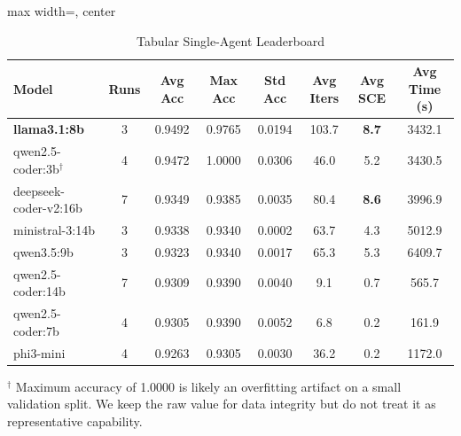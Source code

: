 \documentclass[11pt,a4paper]{article}
\begin{document}
\begin{table}[ht]
\centering
\footnotesize
\setlength{\tabcolsep}{3pt}
\caption{Tabular Single-Agent Leaderboard}
\label{tab:tabular_single}
\begin{adjustbox}{max width=\textwidth, center}
\begin{tabular}{>{\raggedright\arraybackslash}p{4.2cm}ccccccc}
\toprule
\textbf{Model} & \textbf{Runs} & \textbf{Avg Acc} & \textbf{Max Acc} & \textbf{Std Acc} & \textbf{Avg Iters} & \textbf{Avg SCE} & \textbf{Avg Time (s)} \\
\midrule
\textbf{llama3.1:8b} & 3 & 0.9492 & 0.9765 & 0.0194 & 103.7 & \textbf{8.7} & 3432.1 \\
qwen2.5-coder:3b$^\dagger$ & 4 & 0.9472 & 1.0000 & 0.0306 & 46.0 & 5.2 & 3430.5 \\
deepseek-coder-v2:16b & 7 & 0.9349 & 0.9385 & 0.0035 & 80.4 & \textbf{8.6} & 3996.9 \\
ministral-3:14b & 3 & 0.9338 & 0.9340 & 0.0002 & 63.7 & 4.3 & 5012.9 \\
qwen3.5:9b & 3 & 0.9323 & 0.9340 & 0.0017 & 65.3 & 5.3 & 6409.7 \\
qwen2.5-coder:14b & 7 & 0.9309 & 0.9390 & 0.0040 & 9.1 & 0.7 & 565.7 \\
qwen2.5-coder:7b & 4 & 0.9305 & 0.9390 & 0.0052 & 6.8 & 0.2 & 161.9 \\
phi3-mini & 4 & 0.9263 & 0.9305 & 0.0030 & 36.2 & 0.2 & 1172.0 \\
\bottomrule
\end{tabular}
\end{adjustbox}
\vspace{2pt}
\begin{minipage}{0.98\textwidth}
\footnotesize
$^\dagger$ Maximum accuracy of 1.0000 is likely an overfitting artifact on a small validation split. We keep the raw value for data integrity but do not treat it as representative capability.
\end{minipage}
\end{table}
\end{document}
